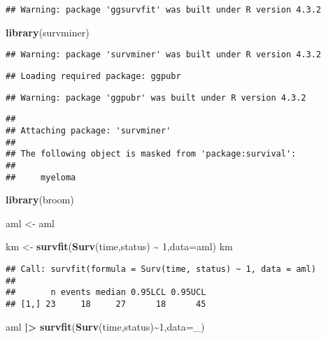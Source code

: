 \documentclass[
]{article}
\newenvironment{Shaded}{\begin{snugshade}}{\end{snugshade}}
\newcommand{\AttributeTok}[1]{\textcolor[rgb]{0.13,0.29,0.53}{#1}}
\newcommand{\DecValTok}[1]{\textcolor[rgb]{0.00,0.00,0.81}{#1}}
\newcommand{\FunctionTok}[1]{\textcolor[rgb]{0.13,0.29,0.53}{\textbf{#1}}}
\newcommand{\NormalTok}[1]{#1}
\newcommand{\OtherTok}[1]{\textcolor[rgb]{0.56,0.35,0.01}{#1}}
\newcommand{\SpecialCharTok}[1]{\textcolor[rgb]{0.81,0.36,0.00}{\textbf{#1}}}
\begin{document}
\begin{verbatim}
## Warning: package 'ggsurvfit' was built under R version 4.3.2
\end{verbatim}

\begin{Shaded}
\begin{Highlighting}[]
\FunctionTok{library}\NormalTok{(survminer)}
\end{Highlighting}
\end{Shaded}

\begin{verbatim}
## Warning: package 'survminer' was built under R version 4.3.2
\end{verbatim}

\begin{verbatim}
## Loading required package: ggpubr
\end{verbatim}

\begin{verbatim}
## Warning: package 'ggpubr' was built under R version 4.3.2
\end{verbatim}

\begin{verbatim}
## 
## Attaching package: 'survminer'
## 
## The following object is masked from 'package:survival':
## 
##     myeloma
\end{verbatim}

\begin{Shaded}
\begin{Highlighting}[]
\FunctionTok{library}\NormalTok{(broom)}

\NormalTok{aml }\OtherTok{\textless{}{-}}\NormalTok{ aml}

\NormalTok{km }\OtherTok{\textless{}{-}} \FunctionTok{survfit}\NormalTok{(}\FunctionTok{Surv}\NormalTok{(time,status) }\SpecialCharTok{\textasciitilde{}} \DecValTok{1}\NormalTok{,}\AttributeTok{data=}\NormalTok{aml)}
\NormalTok{km}
\end{Highlighting}
\end{Shaded}

\begin{verbatim}
## Call: survfit(formula = Surv(time, status) ~ 1, data = aml)
## 
##       n events median 0.95LCL 0.95UCL
## [1,] 23     18     27      18      45
\end{verbatim}

\begin{Shaded}
\begin{Highlighting}[]
\NormalTok{aml }\SpecialCharTok{|\textgreater{}} 
  \FunctionTok{survfit}\NormalTok{(}\FunctionTok{Surv}\NormalTok{(time,status)}\SpecialCharTok{\textasciitilde{}}\DecValTok{1}\NormalTok{,}\AttributeTok{data=}\NormalTok{\_)}
\end{Highlighting}
\end{Shaded}
\end{document}
